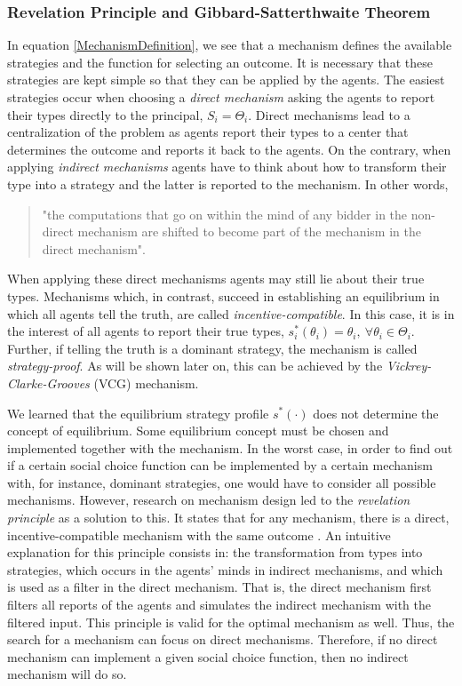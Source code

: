 \subsubsection{Revelation Principle and Gibbard-Satterthwaite Theorem}
In equation \ref{MechanismDefinition}, we see that a mechanism
defines the available strategies and the function for selecting an
outcome. It is necessary that these strategies are kept simple so
that they can be applied by the agents. The easiest strategies
occur when choosing a \emph{direct mechanism} asking the agents to
report their types directly to the principal, $S_i=\Theta_i$.
Direct mechanisms lead to a centralization of the problem as
agents report their types to a center that determines the outcome
and reports it back to the agents. On the contrary, when applying
\emph{indirect mechanisms} agents have to think about how to
transform their type into a strategy and the latter is reported to
the mechanism. In other words,
\begin{quote} "the computations that go on within the mind of any
bidder in the non-direct mechanism are shifted to become part of
the mechanism in the direct mechanism". \textcite[p.~712]{Bastian.2011}
\end{quote}
When applying these direct mechanisms agents may still lie about
their true types. Mechanisms which, in contrast, succeed in
establishing an equilibrium in which all agents tell the truth,
are called \emph{incentive-compatible}. In this case, it is in the
interest of all agents to report their true types,
$s^\ast_i(\theta_i) = \theta_i,~\forall \theta_i \in \Theta_i$.
Further, if telling the truth is a dominant strategy, the
mechanism is called \emph{strategy-proof}. As will be shown later
on, this can be achieved by the \emph{Vickrey-Clarke-Grooves}
(VCG) mechanism.

We learned that the equilibrium strategy profile $s^\ast(\cdot)$
does not determine the concept of equilibrium. Some equilibrium
concept must be chosen and implemented together with the mechanism. In the
worst case, in order to find out if a certain social choice
function can be implemented by a certain mechanism with, for
instance, dominant strategies, one would have to consider all
possible mechanisms. However, research on mechanism design led to
the \emph{revelation principle} as a solution to this. It states
that for any mechanism, there is a direct, incentive-compatible
mechanism with the same outcome \parencite{Bastian.2011}. An intuitive
explanation for this principle consists in: the transformation
from types into strategies, which occurs in the agents' minds in
indirect mechanisms, and which is used as a filter in the direct mechanism.
That is, the direct mechanism first filters all reports of the
agents and simulates the indirect mechanism with the filtered
input. This principle is valid for the optimal mechanism as well.
Thus, the search for a mechanism can focus on direct
mechanisms. Therefore, if no direct mechanism can implement a
given social choice function, then no indirect mechanism will do
so.

